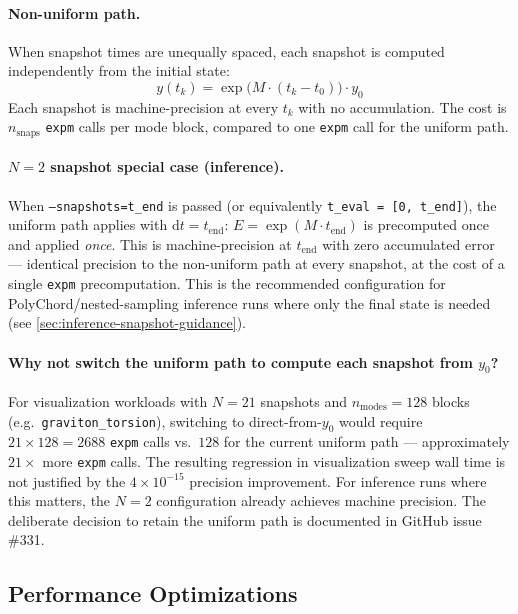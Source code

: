 \paragraph{Non-uniform path.}
When snapshot times are unequally spaced, each snapshot is computed independently from the initial state:
\begin{equation}
y(t_k) = \exp\!\bigl(M \cdot (t_k - t_0)\bigr) \cdot y_0
\end{equation}
Each snapshot is machine-precision at every $t_k$ with no accumulation. The cost is $n_\mathrm{snaps}$ \texttt{expm} calls per mode block, compared to one \texttt{expm} call for the uniform path.

\paragraph{$N=2$ snapshot special case (inference).}
When \texttt{--snapshots=t\_end} is passed (or equivalently \texttt{t\_eval = [0, t\_end]}), the uniform path applies with $\mathrm{d}t = t_\mathrm{end}$: $E = \exp(M \cdot t_\mathrm{end})$ is precomputed once and applied \emph{once}. This is machine-precision at $t_\mathrm{end}$ with zero accumulated error --- identical precision to the non-uniform path at every snapshot, at the cost of a single \texttt{expm} precomputation. This is the recommended configuration for PolyChord/nested-sampling inference runs where only the final state is needed (see \cref{sec:inference-snapshot-guidance}).

\paragraph{Why not switch the uniform path to compute each snapshot from $y_0$?}
For visualization workloads with $N=21$ snapshots and $n_\mathrm{modes}=128$ blocks (e.g.\ \texttt{graviton\_torsion}), switching to direct-from-$y_0$ would require $21 \times 128 = 2688$ \texttt{expm} calls vs.\ $128$ for the current uniform path --- approximately $21\times$ more \texttt{expm} calls. The resulting regression in visualization sweep wall time is not justified by the $4 \times 10^{-15}$ precision improvement. For inference runs where this matters, the $N=2$ configuration already achieves machine precision. The deliberate decision to retain the uniform path is documented in GitHub issue \#331.

\subsection{Performance Optimizations}
\label{sec:modal-perf-optimizations}

